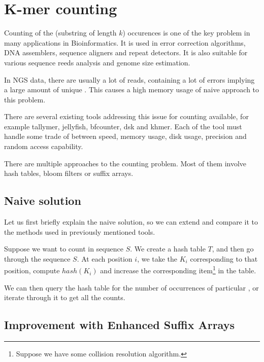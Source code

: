 \chapter{K-mer counting}


Counting of the \kmer (substring of length $k$) occurences is one of the key problem in many applications in Bioinformatics.
It is used in error correction algorithms, DNA assemblers, sequence aligners and repeat detectors. It is also suitable for various sequence reeds analysis and genome size estimation.

In NGS data, there are usually a lot of reads, containing a lot of errors implying a large amount of unique \kmers.
This causes a high memory usage of naive approach to this problem.

There are several existing tools addressing this issue for \kmer counting available, for example tallymer\cite{tallymer}, jellyfish\cite{jellyfish}, bfcounter\cite{bfcounter}, dsk\cite{dsk} and khmer\cite{khmer}. Each of the tool must handle some trade of between speed, memory usage, disk usage, precision and random access capability.

There are multiple approaches to the \kmer counting problem. Most of them involve hash tables, bloom filters or suffix arrays.

\section{Naive solution}

Let us first briefly explain the naive solution, so we can extend and compare it to the methods used in previously mentioned tools.

Suppose we want to count \kmers in sequence $S$.
We create a hash table $T$, and then go through the sequence $S$.
At each position $i$, we take the \kmer $K_i$ corresponding to that  position, compute $hash(K_i)$ and increase the corresponding item\footnote{Suppose we have some collision resolution algorithm.} in the table.

We can then query the hash table for the number of occurrences of particular \kmer, or iterate through it to get all the counts.

\section{Improvement with Enhanced Suffix Arrays}

